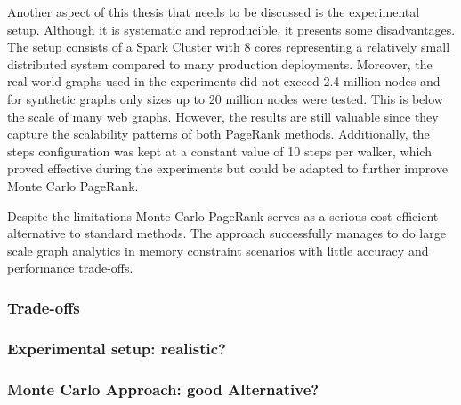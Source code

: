 Another aspect of this thesis that needs to be discussed is the experimental setup. Although it is systematic and reproducible, it presents some disadvantages. The setup consists of a Spark Cluster with 8 cores representing a relatively small distributed system compared to many production deployments. Moreover, the real-world graphs used in the experiments did not exceed 2.4 million nodes and for synthetic graphs only sizes up to 20 million nodes were tested. This is below the scale of many web graphs. However, the results are still valuable since they capture the scalability patterns of both PageRank methods. Additionally, the steps configuration was kept at a constant value of 10 steps per walker, which proved effective during the experiments but could be adapted to further improve Monte Carlo PageRank.\par

Despite the limitations Monte Carlo PageRank serves as a serious cost efficient alternative to standard methods. The approach successfully manages to do large scale graph analytics in memory constraint scenarios with little accuracy and performance trade-offs.



\subsubsection{Trade-offs}
\subsubsection{Experimental setup: realistic?}
\subsubsection{Monte Carlo Approach: good Alternative?}

